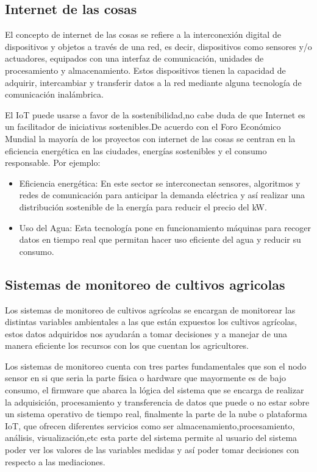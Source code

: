 \subsection{Internet de las cosas}
El concepto de internet de las cosas se refiere a la interconexión digital de dispositivos y objetos a través de una red, es decir, dispositivos como sensores y/o actuadores, equipados con una interfaz de comunicación, unidades de procesamiento y almacenamiento. Estos dispositivos tienen la capacidad de adquirir, intercambiar y transferir datos a la red mediante alguna tecnología de comunicación inalámbrica.

El IoT puede usarse a favor de la sostenibilidad,no cabe duda de que Internet es un facilitador de iniciativas sostenibles.De acuerdo con el Foro Económico Mundial la mayoría de los proyectos con internet de las cosas se centran en la eficiencia energética en las ciudades, energías sostenibles y el consumo responsable. Por ejemplo:
\begin{itemize}
  \item Eficiencia energética: En este sector se interconectan sensores, algoritmos y redes de comunicación para anticipar la demanda eléctrica y así realizar una distribución sostenible de la energía para reducir el precio del kW.
  \item Uso del Agua: Esta tecnología pone en funcionamiento máquinas para recoger datos en tiempo real que permitan hacer uso eficiente del agua y reducir su consumo.
  
\end{itemize}

\subsection{Sistemas de monitoreo de cultivos agricolas}
Los sistemas de monitoreo de cultivos agrícolas se encargan de monitorear
las distintas variables ambientales a las que están expuestos los cultivos agrícolas, estos datos adquiridos nos ayudarán a tomar decisiones y a manejar de una manera eficiente los recursos con los que cuentan los agricultores.

Los sistemas de monitoreo cuenta con tres partes fundamentales que son el nodo sensor en si que seria la parte física o hardware que mayormente es de bajo consumo, el firmware que abarca la lógica del sistema que se encarga de realizar la adquisición, procesamiento y transferencia de datos que puede o no estar sobre un sistema operativo de tiempo real, finalmente la parte de la nube o plataforma IoT, que ofrecen diferentes servicios como ser almacenamiento,procesamiento, análisis, visualización,etc esta parte del sistema permite al usuario del sistema poder ver los valores de las variables medidas y así poder tomar decisiones con respecto a las mediaciones.
\vspace{4cm}

